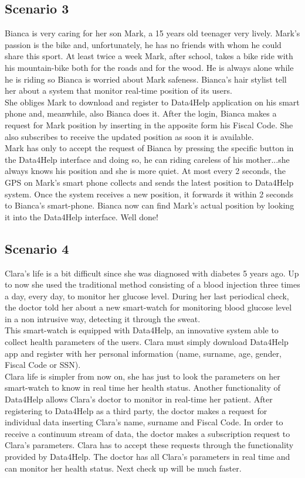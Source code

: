     \subsection{Scenario 3}
    Bianca is very caring for her son Mark, a 15 years old teenager very lively.
    Mark’s passion is the bike and, unfortunately, he has no friends with whom he could share this sport. At least twice a week Mark, after school, takes a bike ride with his mountain-bike both for the roads and for the wood.
    He is always alone while he is riding so Bianca is worried about Mark safeness.
    Bianca’s hair stylist tell her about a system that monitor real-time position of its users. \\
    She obliges Mark to download and register to Data4Help application on his smart phone and, meanwhile, also Bianca does it.
    After the login, Bianca makes a request for Mark position by inserting in the apposite form his Fiscal Code. She also subscribes to receive the updated position as soon it is available. \\
    Mark has only to accept the request of Bianca by pressing the specific button in the Data4Help interface and doing so, he can riding careless of his mother...she always knows his position and she is more quiet. At most every 2 seconds, the GPS on Mark’s smart phone collects and sends the latest position to Data4Help system. Once the system receives a new position, it forwards it within 2 seconds to Bianca’s smart-phone. Bianca now can find Mark’s actual position by looking it into the Data4Help interface.
    Well done!
    
    \subsection{Scenario 4}
    Clara's life is a bit difficult since she was diagnosed with diabetes 5 years ago.
    Up to now she used the traditional method consisting of a blood injection three times a day, every day, to monitor her glucose level.
    During her last periodical check, the doctor told her about a new smart-watch for monitoring blood glucose level in a non intrusive way, detecting it through the sweat. \\
    This smart-watch is equipped with Data4Help, an innovative system able to collect health parameters of the users.
    Clara must simply download Data4Help app and register with her personal information (name, surname, age, gender, Fiscal Code or SSN). \\
    Clara life is simpler from now on, she has just to look the parameters on her smart-watch to know in real time her health status.
    Another functionality of Data4Help allows Clara's doctor to monitor in real-time her patient. After registering to Data4Help as a third party, the doctor makes a request for individual data inserting Clara's name, surname and Fiscal Code. In order to receive a continuum stream of data, the doctor makes a subscription request to Clara's parameters.
    Clara has to accept these requests through the functionality provided by Data4Help.
    The doctor has all Clara's parameters in real time and can monitor her health status.
    Next check up will be much faster.
    

